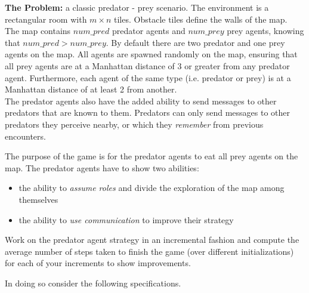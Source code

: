 \documentclass[a4paper, 12pt, twoside]{article}
\begin{document}
\spk{-2ex}

\vspace*{-6ex}\spk{1.2ex}

\textbf{The Problem:} a classic predator - prey scenario. The environment is a rectangular room with $m\times n$ tiles.
Obstacle tiles define the walls of the map.\\
%
The map contains $num\_pred$ predator agents and $num\_prey$ prey agents, knowing that $num\_pred > num\_prey$. By default there are two predator and one prey agents on the map. All agents are spawned randomly on the map, ensuring that all prey agents are at a Manhattan distance of 3 or greater from any predator agent. Furthermore, each agent of the same type (i.e. predator or prey) is at a Manhattan distance of at least 2 from another.\\
%

The predator agents also have the added ability to send messages to other predators that are known to them. Predators can only send messages to other predators they perceive nearby, or which they \textit{remember} from previous encounters.

The purpose of the game is for the predator agents to eat all prey agents on the map. 
The predator agents have to show two abilities:
\begin{itemize}
	\item the ability to \textit{assume roles} and divide the exploration of the map among themselves
	\item the ability to \textit{use communication} to improve their strategy
\end{itemize}

Work on the predator agent strategy in an incremental fashion and compute the average number of steps taken to finish the game (over different initializations) for each of your increments to show improvements.

In doing so consider the following specifications.

\end{document}

